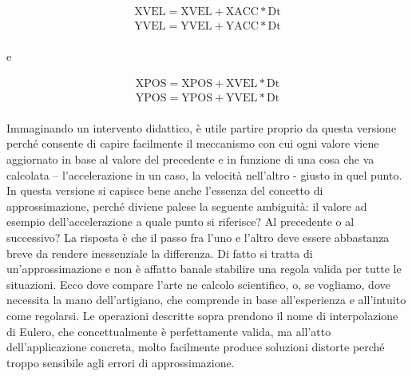\begin{equation}
\begin{array}{ll} \label{eq:pos2}
\textrm{XVEL}=\textrm{XVEL}+\textrm{XACC}*\textrm{Dt}\\
\textrm{YVEL}=\textrm{YVEL}+\textrm{YACC}*\textrm{Dt}\\
\end{array}
\end{equation}

e

\begin{equation}
\begin{array}{ll} \label{eq:vel2}
\textrm{XPOS}=\textrm{XPOS}+\textrm{XVEL}*\textrm{Dt}\\
\textrm{YPOS}=\textrm{YPOS}+\textrm{YVEL}*\textrm{Dt}\\
\end{array}
\end{equation}

Immaginando un intervento didattico, è utile partire proprio da questa versione perché consente di capire facilmente il meccanismo con cui ogni valore viene aggiornato in base al valore del precedente e in funzione di una cosa che va calcolata – l'accelerazione in un caso, la velocità nell'altro - giusto in quel punto. In questa versione si capisce bene anche l'essenza del concetto di approssimazione, perché diviene palese la seguente ambiguità: il valore ad esempio dell'accelerazione a quale punto si riferisce? Al precedente o al successivo? La risposta è che il passo fra l'uno e l'altro deve essere abbastanza breve da rendere inessenziale la differenza. Di fatto si tratta di un'approssimazione e non è affatto banale stabilire una regola valida per tutte le situazioni. Ecco dove compare l'arte ne calcolo scientifico, o, se vogliamo, dove necessita la mano dell'artigiano, che comprende in base all'esperienza e all'intuito come regolarsi. Le operazioni descritte sopra prendono il nome di interpolazione di Eulero, che concettualmente è perfettamente valida, ma all'atto dell'applicazione concreta, molto facilmente produce soluzioni distorte perché troppo sensibile agli  errori di approssimazione. 

